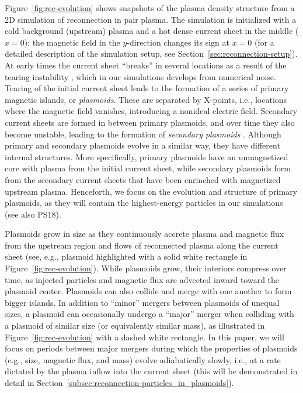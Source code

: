 Figure~\ref{fig:rec-evolution} shows snapshots of the plasma density structure from a 2D simulation of reconnection in pair plasma. The simulation is initialized with a cold background (upstream) plasma and a hot dense current sheet in the middle ($x=0$); the magnetic field in the $y$-direction changes its sign at $x=0$ (for a detailed description of the simulation setup, see Section~\ref{sec:reconnection-setup}). At early times the current sheet ``breaks'' in several locations as a result of the tearing instability \citep{1977PhFl...20.1341D, 2005PhRvL..95i5001Z, 2005ApJ...618L.111Z}, which in our simulations develops from numerical noise. Tearing of the initial current sheet leads to the formation of a series of primary magnetic islands, or {\it plasmoids}. These are separated by X-points, i.e., locations where the magnetic field vanishes, introducing a nonideal electric field. Secondary current sheets are formed in between primary plasmoids, and over time they also become unstable, leading to the formation of {\it secondary plasmoids} \citep{2006GeoRL..3313105D, 2010PhRvL.105w5002U, 2016PhRvL.116j5003U}. Although primary and secondary plasmoids evolve in a similar way, they have different internal structures. More specifically, primary plasmoids have an unmagnetized core with plasma from the initial current sheet, while secondary plasmoids form from the secondary current sheets that have been enrinched with magnetized upstream plasma. Henceforth, we focus on the evolution and structure of primary plasmoids, as they will contain the highest-energy particles in our simulations (see also PS18).

Plasmoids grow in size as they continuously accrete plasma and magnetic flux from the upstream region and flows of reconnected plasma along the current sheet (see, e.g., plasmoid highlighted with a solid white rectangle in Figure~\ref{fig:rec-evolution}). While plasmoids grow, their interiors compress over time, as injected particles and magnetic flux are advected inward toward the plasmoid center. Plasmoids can also collide and merge with one another to form bigger islands. In addition to ``minor'' mergers between plasmoids of unequal sizes, a plasmoid can occasionally undergo a ``major'' merger when colliding with a plasmoid of similar size (or equivalently similar mass), as illustrated in Figure~\ref{fig:rec-evolution} with a dashed white rectangle. In this paper, we will focus on periods between major mergers during which the properties of plasmoids (e.g., size, magnetic flux, and mass) evolve adiabatically slowly, i.e., at a rate dictated by the plasma inflow into the current sheet (this will be demonstrated in detail in Section~\ref{subsec:reconnection-particles_in_plasmoids}).

